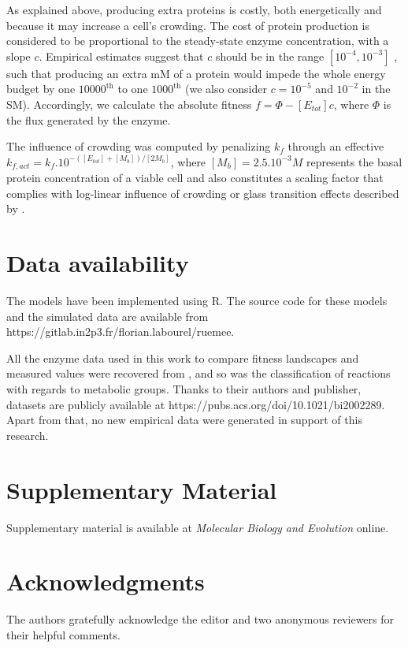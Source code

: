 \documentclass[nogrid,crop,final]{MBE2}%
\begin{document}
As explained above, producing extra proteins is costly, both energetically and because it may increase a cell's crowding. The cost of protein production is considered to be proportional to the steady-state enzyme concentration, with a slope $c$. Empirical estimates suggest that $c$ should be in the range $[10^{-4}, 10^{-3}]$ \citep{Wagner05,Lynch15}, such that producing an extra mM of a protein would impede the whole energy budget by one $10000^\text{th}$ to one $1000^\text{th}$ (we also consider $c=10^{-5}$ and $10^{-2}$ in the SM). Accordingly, we calculate the absolute fitness $f=\Phi-[E_{tot}]c$, where $\Phi$ is the flux generated by the enzyme. 

The influence of crowding was computed by penalizing $k_f$ through an effective $k_{f,act}=k_f.10^{-([E_{tot}]+[M_b])/[2M_b]}$, where $[M_b]=2.5.10^{-3}M$ represents the basal protein concentration of a viable cell and also constitutes a scaling factor that complies with \citet{Andrews20} log-linear influence of crowding or glass transition effects described by \citep{Dill11}.


\section{Data availability}

The models have been implemented using R. The source code for these models and the simulated data are available from https://gitlab.in2p3.fr/florian.labourel/ruemee.

All the enzyme data used in this work to compare fitness landscapes and measured values were recovered from \citep{Bar-Even11}, and so was the classification of reactions with regards to metabolic groups. Thanks to their authors and publisher, datasets are publicly available at https://pubs.acs.org/doi/10.1021/bi2002289. Apart from that, no new empirical data were generated in support of this research.

\section{Supplementary Material}

Supplementary material is available at \textit{Molecular Biology and Evolution} online. %

\section{Acknowledgments}

The authors gratefully acknowledge the editor and two anonymous reviewers for their helpful comments.

\end{document}
